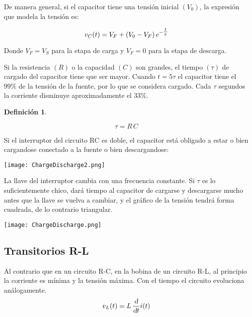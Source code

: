 \documentclass[a5paper,12pt,twoside]{book}
\newtheorem{defn}{{Definición}}[chapter]
\begin{document}
De manera general, si el capacitor tiene una tensión inicial $(V_0)$, la expresión que modela la tensión es:

\begin{equation*}
    v_C(t) = V_F + \left(V_0 - V_F\right) e^{-\tfrac{t}{\tau}}
\end{equation*}

Donde $V_F = V_S$ para la etapa de carga y $V_F = 0$ para la etapa de descarga.

Si la resistencia $(R)$ o la capacidad $(C)$ son grandes, el tiempo $(\tau)$ de cargado del capacitor tiene que ser mayor. Cuando $t=5\tau$ el capacitor tiene el $99\%$ de la tensión de la fuente, por lo que se considera cargado. Cada $\tau$ segundos la corriente disminuye aproximadamente el $33\%$.

\begin{mdframed}[style=MyFrame1]
    \begin{defn}
    \end{defn}
    \begin{equation*}
        \tau = R \, C
    \end{equation*}
\end{mdframed}

Si el interruptor del circuito RC es doble, el capacitor está obligado a estar o bien cargandose conectado a la fuente o bien descargandose:

\begin{center}
    \texttt{[image: ChargeDischarge2.png]}
\end{center}

La llave del interruptor cambia con una frecuencia constante. Si $\tau$ es lo suficientemente chico, dará tiempo al capacitor de cargarse y descargarse mucho antes que la llave se vuelva a cambiar, y el gráfico de la tensión tendrá forma cuadrada, de lo contrario triangular.

\begin{center}
    \texttt{[image: ChargeDischarge.png]}
\end{center}


\subsection*{Transitorios R-L}

Al contrario que en un circuito R-C, en la bobina de un circuito R-L, al principio la corriente es mínima y la tensión máxima. Con el tiempo el circuito evoluciona análogamente.
\begin{equation*}
    v_L(t) = L \, \frac{\textsl{d}}{\textsl{d} t} i(t)
\end{equation*}
\end{document}

